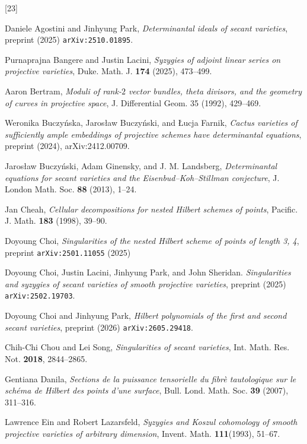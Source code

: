\documentclass{amsart}
\theoremstyle{plain}
\theoremstyle{definition}
\theoremstyle{remark}
\begin{document}
\begin{thebibliography}{[23]}

Daniele Agostini and Jinhyung Park, \emph{Determinantal ideals of secant varieties}, preprint (2025) {\tt arXiv:2510.01895}.

Purnaprajna Bangere and Justin Lacini, \textit{Syzygies of adjoint linear series on projective varieties}, Duke. Math. J. \textbf{174} (2025), 473--499.

Aaron Bertram, \textit{Moduli of rank-{$2$} vector bundles, theta divisors, and the geometry of curves in projective space}, J. Differential Geom. 35 (1992), 429--469.

Weronika Buczy\'nska, Jaros{\l}aw Buczy\'nski, and {\L}ucja Farnik,
\textit{Cactus varieties of sufficiently ample embeddings of projective schemes have determinantal equations}, preprint (2024), arXiv:2412.00709.

Jaros{\l}aw Buczy\'nski, Adam Ginensky, and J. M. Landsberg, \textit{Determinantal equations for secant varieties and the Eisenbud--Koh--Stillman conjecture}, J. London Math. Soc. \textbf{88} (2013), 1--24.

Jan Cheah, \textit{Cellular decompositions for nested Hilbert schemes of points}, Pacific. J. Math. \textbf{183} (1998), 39--90.

Doyoung Choi, \emph{Singularities of the nested Hilbert scheme of points of length 3, 4}, preprint {\tt arXiv:2501.11055} (2025)

Doyoung Choi, Justin Lacini, Jinhyung Park, and John Sheridan. \emph{Singularities and syzygies of secant varieties of smooth projective varieties}, preprint (2025) {\tt arXiv:2502.19703}.

Doyoung Choi and Jinhyung Park, \emph{Hilbert polynomials of the first and second secant varieties}, preprint (2026) {\tt arXiv:2605.29418}. 

Chih-Chi Chou and Lei Song, \textit{Singularities of secant varieties}, Int. Math. Res. Not. \textbf{2018}, 2844--2865.

Gentiana Danila,
\textit{Sections de la puissance tensorielle du fibr\`e tautologique sur le sch\'ema de Hilbert des points d'une surface}, Bull. \!Lond. \!Math. \!Soc. \textbf{39} (2007), 311--316.

Lawrence Ein and Robert Lazarsfeld, \emph{Syzygies and Koszul cohomology of smooth projective varieties of arbitrary dimension}, Invent. Math. \textbf{111}(1993), 51--67.


\end{thebibliography}
\end{document}
